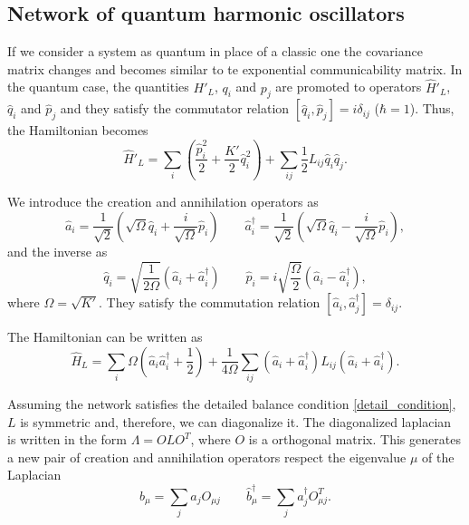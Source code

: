 \subsection{Network of quantum harmonic oscillators}

If we consider a system as quantum in place of a classic one the covariance matrix changes and becomes similar to te exponential communicability matrix.
In the quantum case, the quantities $H'_L$, $q_i$ and $p_j$ are promoted to operators $\hat H'_L$, $\hat q_i$ and $\hat p_j$ and they satisfy the commutator relation $\left[\hat q_i, \hat p_j\right] = i \delta_{ij}$ ($\hbar = 1$). Thus, the Hamiltonian becomes
\begin{equation}\label{H_L_QM}
    \hat H'_L = \sum_i\left(\frac{\hat p_i^2}{2}+\frac{K'}{2}\hat q_i^2\right) + \sum_{ij}\frac{1}{2} L_{ij}\hat q_i\hat q_j.
\end{equation}

We introduce the creation and annihilation operators as
\begin{equation}
     \hat a_i = \frac{1}{\sqrt{2}}\left(\sqrt{\Omega} \hat q_i + \frac{i}{\sqrt{\Omega}}\hat p_i\right) \qquad 
     \hat a_i^\dagger = \frac{1}{\sqrt{2}}\left(\sqrt{\Omega} \hat q_i - \frac{i}{\sqrt{\Omega}}\hat p_i\right), 
\end{equation}
and the inverse as
\begin{equation}
    \hat q_i = \sqrt{\frac{1}{2\Omega}}\left(\hat a_i + \hat a_i^\dagger\right) \qquad
    \hat p_i = i\sqrt{\frac{\Omega}{2}}\left(\hat a_i - \hat a_i^\dagger\right),
\end{equation}
where $\Omega = \sqrt{K'}$.
They satisfy the commutation relation $\left[\hat a_i, \hat a^\dagger_j\right] = \delta_{ij}$. 

The Hamiltonian can be written as 
\begin{equation}
    \hat H_L = \sum_i \Omega \left(\hat a_i\hat a^\dagger_i + \frac{1}{2}\right) + \frac{1}{4\Omega}\sum_{ij}\left(\hat a_i +\hat a_i^\dagger\right)L_{ij}\left(\hat a_i +\hat a_i^\dagger\right).
\end{equation}

Assuming the network satisfies the detailed balance condition \eqref{detail_condition}, $L$ is symmetric and, therefore, we can diagonalize it. The diagonalized laplacian is written in the form $\Lambda = OLO^T$, where $O$ is a orthogonal matrix.
This generates a new pair of creation and annihilation operators respect the eigenvalue $\mu$ of the Laplacian
\begin{equation}
    b_\mu = \sum_j a_jO_{\mu j}  \qquad \hat b_\mu^\dagger = \sum_j a_j^\dagger O^T_{\mu j} .
\end{equation}

